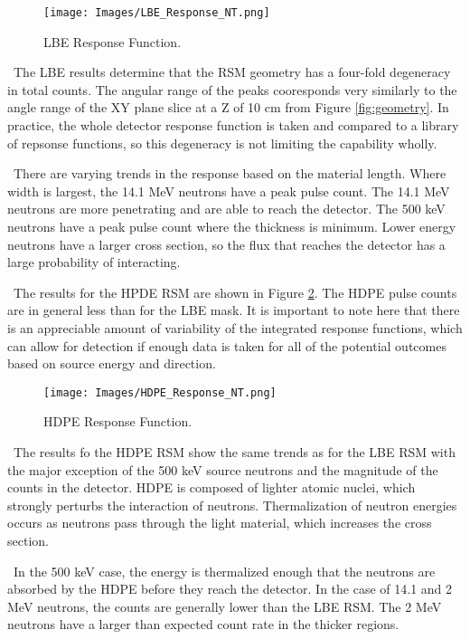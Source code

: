 \documentclass[journal]{IEEEtran}
\let\MYoriglatexcaption\caption
\renewcommand{\caption}[2][\relax]{\MYoriglatexcaption[#2]{#2}}
\begin{document}
	\begin{figure}[ht]
		\texttt{[image: Images/LBE\_Response\_NT.png]}
		\centering
		\caption{LBE Response Function.}
		\label{fig:LBE_Response}
	\end{figure}

    \ The LBE results determine that the RSM geometry has a four-fold degeneracy in total counts.  The angular range of the peaks cooresponds very similarly to the angle range of the XY plane slice at a Z of 10 cm from Figure \ref{fig:geometry}.  In practice, the whole detector response function is taken and compared to a library of repsonse functions, so this degeneracy is not limiting the capability wholly. 
    
    \ There are varying trends in the response based on the material length.  Where width is largest, the 14.1 MeV neutrons have a peak pulse count.  The 14.1 MeV neutrons are more penetrating and are able to reach the detector. The 500 keV neutrons have a peak pulse count where the thickness is minimum.  Lower energy neutrons have a larger cross section, so the flux that reaches the detector has a large probability of interacting. 

	\ The results for the HPDE RSM are shown in Figure \ref{fig:HDPE_Response}. The HDPE pulse counts are in general less than for the LBE mask. It is important to note here that there is an appreciable amount of variability of the integrated response functions, which can allow for detection if enough data is taken for all of the potential outcomes based on source energy and direction. 
	
	\begin{figure}[h]
		\texttt{[image: Images/HDPE\_Response\_NT.png]}
		\centering
		\caption{HDPE Response Function.}
		\label{fig:HDPE_Response}
	\end{figure}
	
	\ The results fo the HDPE RSM show the same trends as for the LBE RSM with the major exception of the 500 keV source neutrons and the magnitude of the counts in the detector.  HDPE is composed of lighter atomic nuclei, which strongly perturbs the interaction of neutrons.  Thermalization of neutron energies occurs as neutrons pass through the light material, which increases the cross section. 
	
	\ In the 500 keV case, the energy is thermalized enough that the neutrons are absorbed by the HDPE before they reach the detector. In the case of 14.1 and 2 MeV neutrons, the counts are generally lower than the LBE RSM.  The 2 MeV neutrons have a larger than expected count rate in the thicker regions. 
	
\end{document}
